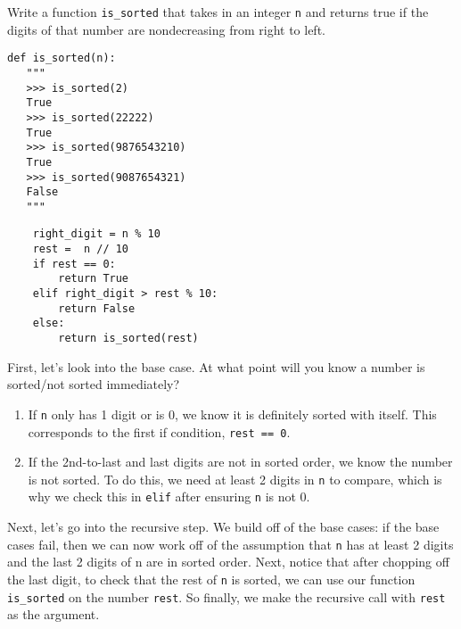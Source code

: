\begin{blocksection}
\question Write a function \lstinline$is_sorted$ that takes in an integer
\lstinline$n$ and returns true if the digits of that number are nondecreasing from
right to left.

\begin{lstlisting}
def is_sorted(n):
   """
   >>> is_sorted(2)
   True
   >>> is_sorted(22222)
   True
   >>> is_sorted(9876543210)
   True
   >>> is_sorted(9087654321)
   False
   """
\end{lstlisting}
\end{blocksection}


\begin{blocksection}
\begin{solution}[1in]
\begin{lstlisting}
    right_digit = n % 10
    rest =  n // 10
    if rest == 0:
        return True
    elif right_digit > rest % 10:
        return False
    else:
        return is_sorted(rest)
\end{lstlisting}

First, let’s look into the base case. At what point will you know a number is sorted/not sorted immediately?
\begin{enumerate}
\item If \lstinline{n} only has 1 digit or is 0, we know it is definitely sorted with itself. This corresponds to the first if condition, \lstinline{rest == 0}. 
\item If the 2nd-to-last and last digits are not in sorted order, we know the number is not sorted. To do this, we need at least 2 digits in \lstinline{n} to compare, which is why we check this in \lstinline{elif} after ensuring \lstinline{n} is not 0. 
\end{enumerate}

Next, let’s go into the recursive step. We build off of the base cases: if the base cases fail, then we can now work off of the assumption that \lstinline{n} has at least 2 digits and the last 2 digits of n are in sorted order. Next, notice that after chopping off the last digit, to check that the rest of \lstinline{n} is sorted, we can use our function \lstinline{is_sorted} on the number \lstinline{rest}. So finally, we make the recursive call with \lstinline{rest} as the argument.

\end{solution}
\end{blocksection}

